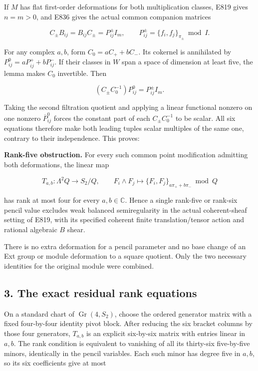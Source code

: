 If \(M\) has flat first-order deformations for both multiplication
classes, E819 gives \(n=m>0\), and E836 gives the actual common
companion matrices

\[
 C_\pm B_{ij}=B_{ij}C_\pm=P^\pm_{ij}I_m,\qquad
 P^\pm_{ij}=\{f_i,f_j\}_{\pi_\pm}\bmod I.
 \tag{E839.6}
\]

For any complex \(a,b\), form \(C_0=aC_++bC_-\). Its cokernel is
annihilated by \(P^0_{ij}=aP^+_{ij}+bP^-_{ij}\). If their classes in
\(W\) span a space of dimension at least five, the lemma makes \(C_0\)
invertible. Then

\[
 (C_\pm C_0^{-1})P^0_{ij}=P^\pm_{ij}I_m.
 \tag{E839.7}
\]

Taking the second filtration quotient and applying a linear functional
nonzero on one nonzero \(\overline P^0_{ij}\) forces the constant part
of each \(C_\pm C_0^{-1}\) to be scalar. All six equations therefore
make both leading tuples scalar multiples of the same one, contrary to
their independence. This proves:

\textbf{Rank-five obstruction.} For every such common point modification
admitting both deformations, the linear map

\[
 T_{a,b}:\Lambda^2Q\longrightarrow S_2/Q,\qquad
 F_i\wedge F_j\longmapsto
       \{F_i,F_j\}_{a\pi_++b\pi_-}\bmod Q
 \tag{E839.8}
\]

has rank at most four for every \(a,b\in\mathbb C\). Hence a single
rank-five or rank-six pencil value excludes weak balanced semiregularity
in the actual coherent-sheaf setting of E819, with its specified
coherent finite translation/tensor action and rational algebraic \(B\)
shear.

There is no extra deformation for a pencil parameter and no base change
of an Ext group or module deformation to a square quotient. Only the two
necessary identities for the original module were combined.

\subsection{3. The exact residual rank
equations}\label{SF-E839:the-exact-residual-rank-equations}

On a standard chart of \(\operatorname{Gr}(4,S_2)\), choose the ordered
generator matrix with a fixed four-by-four identity pivot block. After
reducing the six bracket columns by those four generators, \(T_{a,b}\)
is an explicit six-by-six matrix with entries linear in \(a,b\). The
rank condition is equivalent to vanishing of all its thirty-six
five-by-five minors, identically in the pencil variables. Each such
minor has degree five in \(a,b\), so its six coefficients give at most

